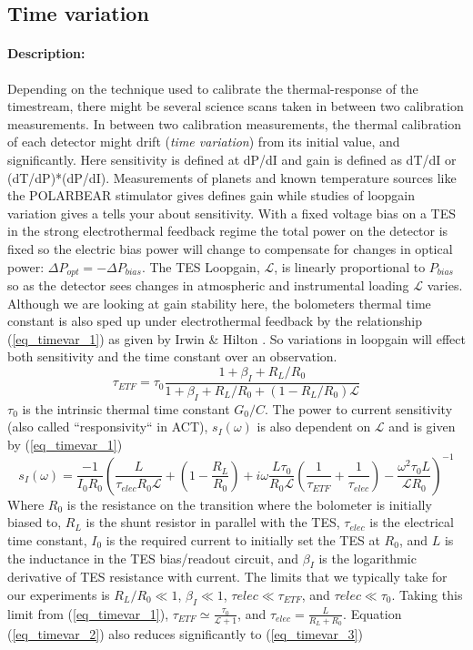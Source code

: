 \subsection{Time variation}

\paragraph{Description:}
Depending on the technique used to calibrate the thermal-response of the timestream, there might be several science scans taken in between two calibration measurements. 
In between two calibration measurements, the thermal calibration of each detector might drift (\emph{time variation}) from its initial value, and significantly. Here sensitivity is defined at dP/dI and gain is defined as dT/dI or (dT/dP)*(dP/dI). Measurements of planets and known temperature sources like the POLARBEAR stimulator gives defines gain while studies of loopgain variation gives a tells your about sensitivity. With a fixed voltage bias on a TES in the strong electrothermal feedback regime the total power on the detector is fixed so the electric bias power will change to compensate for changes in optical power: $\Delta P_{opt}=-\Delta P_{bias}$. The TES Loopgain, $\mathcal{L}$, is linearly proportional to $P_{bias}$ so as the detector sees changes in atmospheric and instrumental loading $\mathcal{L}$ varies. Although we are looking at gain stability here, the bolometers thermal time constant is also sped up under electrothermal feedback by the relationship (\ref{eq_timevar_1}) as given by Irwin \& Hilton \cite{TES_Bible}. So variations in loopgain will effect both sensitivity and the time constant over an observation.
\begin{equation}
\label{eq_timevar_1}
\tau_{ETF}=\tau_0\frac{1+\beta_I+R_L/R_0}{1+\beta_I+R_L/R_0+(1-R_L/R_0)\mathcal{L}}
\end{equation}
$\tau_0$ is the intrinsic thermal time constant $G_0/C$. The power to current sensitivity (also called ``responsivity`` in ACT), $s_I(\omega)$ is also dependent on $\mathcal{L}$ and is given by (\ref{eq_timevar_1})
\begin{equation}
\label{eq_timevar_2}
s_I(\omega)=\frac{-1}{I_0R_0}\left(\frac{L}{\tau_{elec}R_0\mathcal{L}}+(1-\frac{R_L}{R_0})+i\omega\frac{L\tau_0}{R_0\mathcal{L}}(\frac{1}{\tau_{ETF}}+\frac{1}{\tau_{elec}})-\frac{\omega^2\tau_0L}{\mathcal{L}R_0}\right)^{-1}
\end{equation}
Where $R_0$ is the resistance on the transition where the bolometer is initially biased to, $R_L$ is the shunt resistor in parallel with the TES, $\tau_{elec}$ is the electrical time constant, $I_0$ is the required current to initially set the TES at $R_0$, and $L$ is the inductance in the TES bias/readout circuit, and $\beta_I$ is the logarithmic derivative of TES resistance with current. The limits that we typically take for our experiments is $R_L/R_0 \ll 1$, $\beta_I \ll 1$, $\tau{elec} \ll \tau_{ETF}$, and $\tau{elec} \ll \tau_0$. Taking this limit from (\ref{eq_timevar_1}), $\tau_{ETF} \simeq \frac{\tau_0}{\mathcal{L}+1}$, and $\tau_{elec} = \frac{L}{R_L+R_0}$. Equation (\ref{eq_timevar_2}) also reduces  significantly to (\ref{eq_timevar_3})
